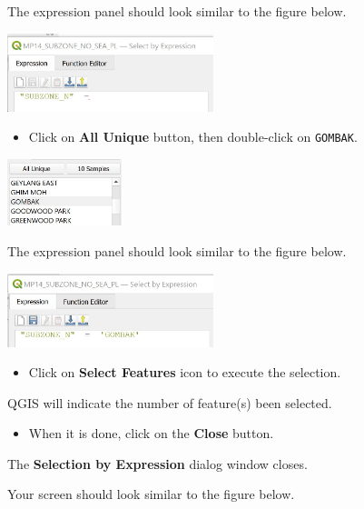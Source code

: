 \documentclass[
  letterpaper,
  DIV=11,
  numbers=noendperiod]{scrreprt}
\providecommand{\tightlist}{%
  \setlength{\itemsep}{0pt}\setlength{\parskip}{0pt}}\usepackage{longtable,booktabs,array}
\begin{document}
The expression panel should look similar to the figure below.

\includegraphics[width=0.45\textwidth,height=\textheight]{./img07/image5.jpg}

\begin{itemize}
\tightlist
\item
  Click on \textbf{All Unique} button, then double-click on
  \texttt{GOMBAK}.
\end{itemize}

\includegraphics[width=0.25\textwidth,height=\textheight]{./img07/image6.jpg}

The expression panel should look similar to the figure below.

\includegraphics[width=0.45\textwidth,height=\textheight]{./img07/image7.jpg}

\begin{itemize}
\tightlist
\item
  Click on \textbf{Select Features} icon to execute the selection.
\end{itemize}

QGIS will indicate the number of feature(s) been selected.

\begin{itemize}
\tightlist
\item
  When it is done, click on the \textbf{Close} button.
\end{itemize}

The \textbf{Selection by Expression} dialog window closes.

Your screen should look similar to the figure below.
\end{document}
